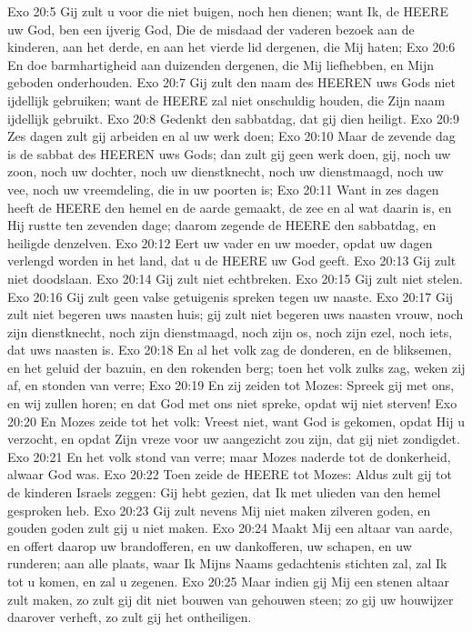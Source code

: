 Exo 20:5  Gij zult u voor die niet buigen, noch hen dienen; want Ik, de HEERE uw God, ben een ijverig God, Die de misdaad der vaderen bezoek aan de kinderen, aan het derde, en aan het vierde lid dergenen, die Mij haten;
Exo 20:6  En doe barmhartigheid aan duizenden dergenen, die Mij liefhebben, en Mijn geboden onderhouden.
Exo 20:7  Gij zult den naam des HEEREN uws Gods niet ijdellijk gebruiken; want de HEERE zal niet onschuldig houden, die Zijn naam ijdellijk gebruikt.
Exo 20:8  Gedenkt den sabbatdag, dat gij dien heiligt.
Exo 20:9  Zes dagen zult gij arbeiden en al uw werk doen;
Exo 20:10  Maar de zevende dag is de sabbat des HEEREN uws Gods; dan zult gij geen werk doen, gij, noch uw zoon, noch uw dochter, noch uw dienstknecht, noch uw dienstmaagd, noch uw vee, noch uw vreemdeling, die in uw poorten is;
Exo 20:11  Want in zes dagen heeft de HEERE den hemel en de aarde gemaakt, de zee en al wat daarin is, en Hij rustte ten zevenden dage; daarom zegende de HEERE den sabbatdag, en heiligde denzelven.
Exo 20:12  Eert uw vader en uw moeder, opdat uw dagen verlengd worden in het land, dat u de HEERE uw God geeft.
Exo 20:13  Gij zult niet doodslaan.
Exo 20:14  Gij zult niet echtbreken.
Exo 20:15  Gij zult niet stelen.
Exo 20:16  Gij zult geen valse getuigenis spreken tegen uw naaste.
Exo 20:17  Gij zult niet begeren uws naasten huis; gij zult niet begeren uws naasten vrouw, noch zijn dienstknecht, noch zijn dienstmaagd, noch zijn os, noch zijn ezel, noch iets, dat uws naasten is.
Exo 20:18  En al het volk zag de donderen, en de bliksemen, en het geluid der bazuin, en den rokenden berg; toen het volk zulks zag, weken zij af, en stonden van verre;
Exo 20:19  En zij zeiden tot Mozes: Spreek gij met ons, en wij zullen horen; en dat God met ons niet spreke, opdat wij niet sterven!
Exo 20:20  En Mozes zeide tot het volk: Vreest niet, want God is gekomen, opdat Hij u verzocht, en opdat Zijn vreze voor uw aangezicht zou zijn, dat gij niet zondigdet.
Exo 20:21  En het volk stond van verre; maar Mozes naderde tot de donkerheid, alwaar God was.
Exo 20:22  Toen zeide de HEERE tot Mozes: Aldus zult gij tot de kinderen Israels zeggen: Gij hebt gezien, dat Ik met ulieden van den hemel gesproken heb.
Exo 20:23  Gij zult nevens Mij niet maken zilveren goden, en gouden goden zult gij u niet maken.
Exo 20:24  Maakt Mij een altaar van aarde, en offert daarop uw brandofferen, en uw dankofferen, uw schapen, en uw runderen; aan alle plaats, waar Ik Mijns Naams gedachtenis stichten zal, zal Ik tot u komen, en zal u zegenen.
Exo 20:25  Maar indien gij Mij een stenen altaar zult maken, zo zult gij dit niet bouwen van gehouwen steen; zo gij uw houwijzer daarover verheft, zo zult gij het ontheiligen.
